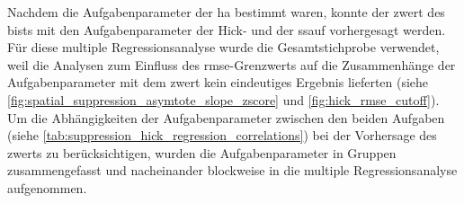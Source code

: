 \documentclass[11pt, twoside, a4paper]{book}		%
\begin{document}
Nachdem die Aufgabenparameter der \gls{ha} bestimmt waren, konnte der \gls{zwert} des \gls{bist}s mit den Aufgabenparameter der Hick- und der \gls{ssauf} vorhergesagt werden. Für diese multiple Regressionsanalyse wurde die Gesamtstichprobe verwendet, weil die Analysen zum Einfluss des \gls{rmse}-Grenzwerts auf die Zusammenhänge der Aufgabenparameter mit dem \gls{zwert} kein eindeutiges Ergebnis lieferten (siehe \autoref{fig:spatial_suppression_asymtote_slope_zscore} und \autoref{fig:hick_rmse_cutoff}). Um die Abhängigkeiten der Aufgabenparameter zwischen den beiden Aufgaben (siehe \autoref{tab:suppression_hick_regression_correlations}) bei der Vorhersage des \gls{zwert}s zu berücksichtigen, wurden die Aufgabenparameter in Gruppen zusammengefasst und nacheinander blockweise in die multiple Regressionsanalyse aufgenommen. 
\end{document}
